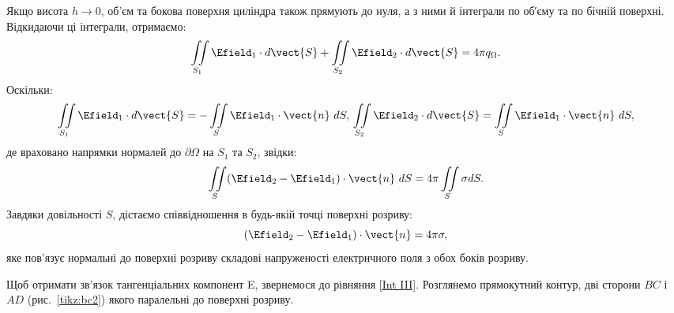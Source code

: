 Якщо висота $h  \to 0$, об'єм та бокова поверхня циліндра також прямують до нуля, а з ними й інтеграли по об′єму та по бічній поверхні. Відкидаючи ці
інтеграли, отримаємо:
\begin{equation*}
    	\iint\limits_{S_1} \Efield_1\cdot d\vect{S} +  \iint\limits_{S_2} \Efield_2\cdot d\vect{S}  = 4\pi q_{\Omega}.
\end{equation*}
Оскільки:
\begin{equation*}
    \iint\limits_{S_1} \Efield_1\cdot d\vect{S}  = - \iint\limits_{S} \Efield_1\cdot \vect{n}\ dS, \quad \\
    \iint\limits_{S_2} \Efield_2\cdot d\vect{S} = \iint\limits_{S} \Efield_1\cdot \vect{n}\ dS,
\end{equation*}
де враховано напрямки нормалей до $\partial\Omega$ на $S_1$ та $S_2$, звідки:
\begin{equation*}
    \iint\limits_{S} (\Efield_2 - \Efield_1)\cdot\vect{n}\ dS = 4\pi \iint\limits_S \sigma dS.
\end{equation*}
Завдяки довільності $S$, дістаємо співвідношення в будь-якій точці поверхні
розриву:
\begin{equation}\label{eq:bc1}
    (\Efield_2 - \Efield_1)\cdot\vect{n} = 4\pi\sigma,
\end{equation}
яке пов’язує нормальні до поверхні розриву складові напруженості
електричного поля з обох боків розриву.

\begin{SCfigure}[0.5][h!]
	\centering
	\caption{До виведення другої граничної умови}%
	\label{tikz:bc2}
\end{SCfigure}

Щоб отримати зв’язок тангенціальних компонент E, звернемося до рівняння \eqref{Int III}. Розглянемо прямокутний контур, дві сторони $BC$ і $AD$
(рис.~\ref{tikz:bc2}) якого паралельні до поверхні розриву.

